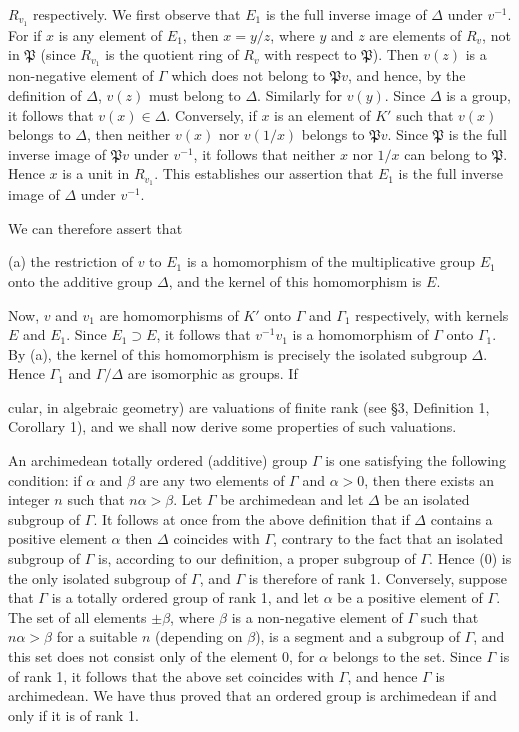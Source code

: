 $R_{v_1}$ respectively. We first observe that $E_1$ is the full inverse image of $\Delta$ under $v^{-1}$. For if $x$ is any element of $E_1$, then $x=y/z$, where $y$ and $z$ are elements of $R_v$, not in $\mathfrak{P}$ (since $R_{v_1}$ is the quotient ring of $R_v$ with respect to $\mathfrak{P}$). Then $v(z)$ is a non-negative element of $\Gamma$ which does not belong to $\mathfrak{P}v$, and hence, by the definition of $\Delta$, $v(z)$ must belong to $\Delta$. Similarly for $v(y)$. Since $\Delta$ is a group, it follows that $v(x) \in \Delta$. Conversely, if $x$ is an element of $K'$ such that $v(x)$ belongs to $\Delta$, then neither $v(x)$ nor $v(1/x)$ belongs to $\mathfrak{P}v$. Since $\mathfrak{P}$ is the full inverse image of $\mathfrak{P}v$ under $v^{-1}$, it follows that neither $x$ nor $1/x$ can belong to $\mathfrak{P}$. Hence $x$ is a unit in $R_{v_1}$. This establishes our assertion that $E_1$ is the full inverse image of $\Delta$ under $v^{-1}$.

We can therefore assert that

(a) the restriction of $v$ to $E_1$ is a homomorphism of the multiplicative group $E_1$ onto the additive group $\Delta$, and the kernel of this homomorphism is $E$.

Now, $v$ and $v_1$ are homomorphisms of $K'$ onto $\Gamma$ and $\Gamma_1$ respectively, with kernels $E$ and $E_1$. Since $E_1 \supset E$, it follows that $v^{-1}v_1$ is a homomorphism of $\Gamma$ onto $\Gamma_1$. By (a), the kernel of this homomorphism is precisely the isolated subgroup $\Delta$. Hence $\Gamma_1$ and $\Gamma/\Delta$ are isomorphic as groups. If

cular, in algebraic geometry) are valuations of finite rank (see §3, Definition 1, Corollary 1), and we shall now derive some properties of such valuations.

An archimedean totally ordered (additive) group $\Gamma$ is one satisfying the following condition: if $\alpha$ and $\beta$ are any two elements of $\Gamma$ and $\alpha > 0$, then there exists an integer $n$ such that $n\alpha > \beta$. Let $\Gamma$ be archimedean and let $\Delta$ be an isolated subgroup of $\Gamma$. It follows at once from the above definition that if $\Delta$ contains a positive element $\alpha$ then $\Delta$ coincides with $\Gamma$, contrary to the fact that an isolated subgroup of $\Gamma$ is, according to our definition, a proper subgroup of $\Gamma$. Hence (0) is the only isolated subgroup of $\Gamma$, and $\Gamma$ is therefore of rank 1. Conversely, suppose that $\Gamma$ is a totally ordered group of rank 1, and let $\alpha$ be a positive element of $\Gamma$. The set of all elements $\pm \beta$, where $\beta$ is a non-negative element of $\Gamma$ such that $n\alpha > \beta$ for a suitable $n$ (depending on $\beta$), is a segment and a subgroup of $\Gamma$, and this set does not consist only of the element 0, for $\alpha$ belongs to the set. Since $\Gamma$ is of rank 1, it follows that the above set coincides with $\Gamma$, and hence $\Gamma$ is archimedean. We have thus proved that an ordered group is archimedean if and only if it is of rank 1.

